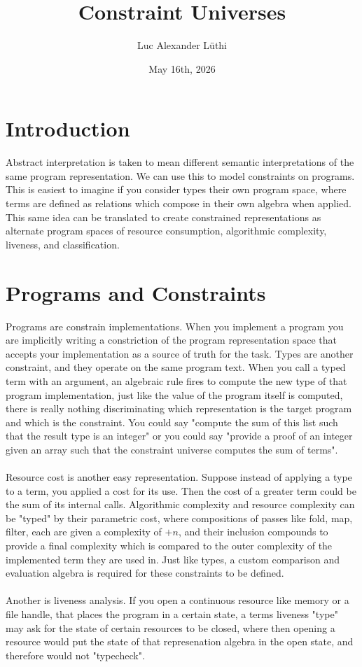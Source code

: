\documentclass{article}
\title{Constraint Universes}
\author{Luc Alexander L{\"u}thi}
\date{May 16th, 2026}
\begin{document}
	\maketitle
	\tableofcontents
	\section{Introduction}
	Abstract interpretation is taken to mean different semantic interpretations of the same program representation. We can use this to model constraints on programs. This is easiest to imagine if you consider types their own program space, where terms are defined as relations which compose in their own algebra when applied. This same idea can be translated to create constrained representations as alternate program spaces of resource consumption, algorithmic complexity, liveness, and classification.
	\section{Programs and Constraints}
	Programs are constrain implementations. When you implement a program you are implicitly writing a constriction of the program representation space that accepts your implementation as a source of truth for the task. Types are another constraint, and they operate on the same program text. When you call a typed term with an argument, an algebraic rule fires to compute the new type of that program implementation, just like the value of the program itself is computed, there is really nothing discriminating which representation is the target program and which is the constraint. You could say "compute the sum of this list such that the result type is an integer" or you could say "provide a proof of an integer given an array such that the constraint universe computes the sum of terms".\\\\
	Resource cost is another easy representation. Suppose instead of applying a type to a term, you applied a cost for its use. Then the cost of a greater term could be the sum of its internal calls. Algorithmic complexity and resource complexity can be "typed" by their parametric cost, where compositions of passes like fold, map, filter, each are given a complexity of $+n$, and their inclusion compounds to provide a final complexity which is compared to the outer complexity of the implemented term they are used in. Just like types, a custom comparison and evaluation algebra is required for these constraints to be defined.\\\\
	Another is liveness analysis. If you open a continuous resource like memory or a file handle, that places the program in a certain state, a terms liveness "type" may ask for the state of certain resources to be closed, where then opening a resource would put the state of that represenation algebra in the open state, and therefore would not "typecheck".
\end{document}
